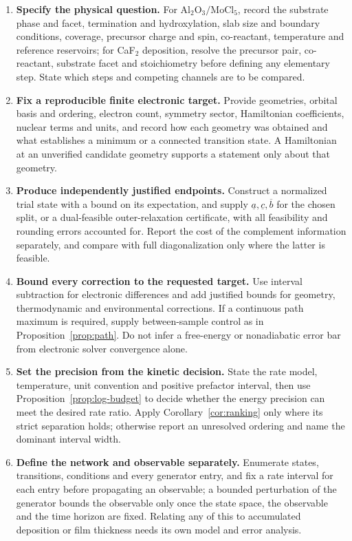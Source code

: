 \begin{enumerate}
\item \textbf{Specify the physical question.} For
$\mathrm{Al_2O_3}/\mathrm{MoCl_5}$, record the substrate phase and facet,
termination and hydroxylation, slab size and boundary conditions, coverage,
precursor charge and spin, co-reactant, temperature and reference reservoirs;
for CaF$_2$ deposition, resolve the precursor pair, co-reactant, substrate facet
and stoichiometry before defining any elementary step. State which steps and
competing channels are to be compared.

\item \textbf{Fix a reproducible finite electronic target.} Provide geometries,
orbital basis and ordering, electron count, symmetry sector, Hamiltonian
coefficients, nuclear terms and units, and record how each geometry was obtained
and what establishes a minimum or a connected transition state. A Hamiltonian at
an unverified candidate geometry supports a statement only about that geometry.

\item \textbf{Produce independently justified endpoints.} Construct a normalized
trial state with a bound on its expectation, and supply
$\underline a,\underline c,\overline b$ for the chosen split, or a dual-feasible
outer-relaxation certificate, with all feasibility and rounding errors accounted
for. Report the cost of the complement information separately, and compare with
full diagonalization only where the latter is feasible.

\item \textbf{Bound every correction to the requested target.} Use interval
subtraction for electronic differences and add justified bounds for geometry,
thermodynamic and environmental corrections. If a continuous path maximum is
required, supply between-sample control as in Proposition~\ref{prop:path}. Do
not infer a free-energy or nonadiabatic error bar from electronic solver
convergence alone.

\item \textbf{Set the precision from the kinetic decision.} State the rate model,
temperature, unit convention and positive prefactor interval, then use
Proposition~\ref{prop:log-budget} to decide whether the energy precision can meet
the desired rate ratio. Apply Corollary~\ref{cor:ranking} only where its strict
separation holds; otherwise report an unresolved ordering and name the dominant
interval width.

\item \textbf{Define the network and observable separately.} Enumerate states,
transitions, conditions and every generator entry, and fix a rate interval for
each entry before propagating an observable; a bounded perturbation of the
generator bounds the observable only once the state space, the observable and
the time horizon are fixed. Relating any of this to accumulated deposition or
film thickness needs its own model and error analysis.
\end{enumerate}

